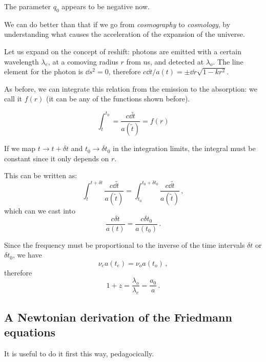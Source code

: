 \documentclass[main.tex]{subfiles}
\begin{document}
The parameter \(q_0 \) appears to be negative now.

We can do better than that if we go from \emph{cosmography} to \emph{cosmology}, by understanding what causes the acceleration of the expansion of the universe.

Let us expand on the concept of reshift:
photons are emitted with a certain wavelength \(\lambda_{e}\), at a comoving radius \(r\) from us, and detected at \(\lambda_{o}\).
The line element for the photon is \(\dd{s^2} =0\), therefore \(c\dd{t}/ a(t) = \pm \dd{r} \sqrt{1-kr^2} \).

As before, we can integrate this relation from the emission to the absorption: we call it \(f(r)\) (it can be any of the functions shown before).

\begin{equation}
  \int_{t}^{t_0 } = \frac{c\dd{\widetilde{t}}}{a(\widetilde{t})} = f(r)
\end{equation}

If we map \(t \rightarrow t + \delta t\) and \(t_0 \rightarrow \delta t_0 \) in the integration limits, the integral must be constant since it only depends on \(r\).

This can be written as:
\begin{equation}
  \int_{t}^{t + \delta t} \frac{c\dd{\widetilde{t}}}{a(\widetilde{t})} = \int_{t_0 }^{t_0 + \delta t_0 } \frac{c\dd{\widetilde{t}}}{a(\widetilde{t})}\,,
\end{equation}
%
which can we cast into
\begin{equation}
  \frac{c \delta t}{a(t)} =   \frac{c \delta t_0 }{a(t_0 )}\,.
\end{equation}

Since the frequency must be proportional to the inverse of the time intervals \(\delta t\) or \(\delta t_0 \), we have
\begin{equation}
  \nu_{e} a(t_{e}) = \nu_{o} a(t_{o})\,,
\end{equation}
%
therefore 
%
\begin{equation}
  1 + z = \frac{\lambda_{o}}{\lambda_{e}}
  = \frac{a_0 }{a}\,.
\end{equation}

\subsection{A Newtonian derivation of the Friedmann equations}

It is useful to do it first this way, pedagocically.
\end{document}
